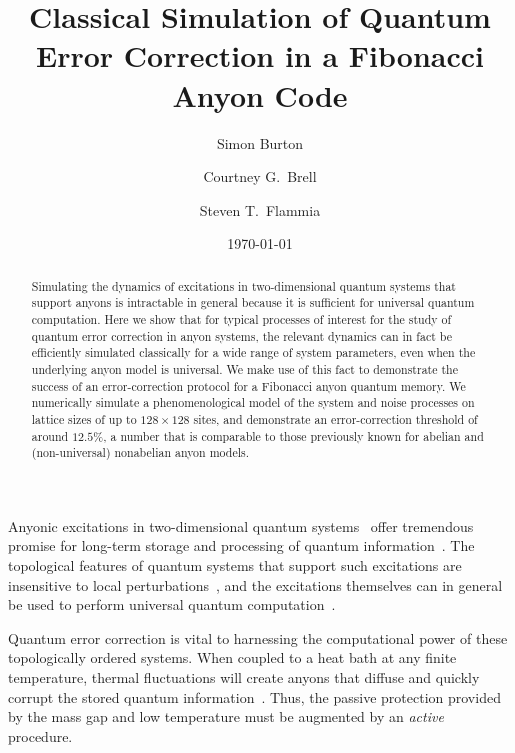 \documentclass[aps, prl, letterpaper, twocolumn, superscriptaddress, notitlepage]{revtex4-1}
\begin{document}
\title{Classical Simulation of Quantum Error Correction in a Fibonacci Anyon Code}

\author{Simon Burton}
\author{Courtney G.\ Brell}
\author{Steven T.\ Flammia}

\date{\today}

\begin{abstract}
Simulating the dynamics of excitations in two-dimensional quantum systems that support 
anyons is intractable in general because it is sufficient for universal quantum computation. 
Here we show that for typical processes of interest for the study of quantum error correction 
in anyon systems, the relevant dynamics can in fact be efficiently simulated classically for a 
wide range of system parameters, even when the underlying anyon model is universal. We 
make use of this fact to demonstrate the success of an error-correction protocol for a 
Fibonacci anyon quantum memory. We numerically simulate a phenomenological model of 
the system and noise processes on lattice sizes of up to $128\times128$ sites, and 
demonstrate an error-correction threshold of around $12.5\%$, a number that is comparable 
to those previously known for abelian and (non-universal) nonabelian anyon models.
\end{abstract}

\maketitle


Anyonic excitations in two-dimensional quantum systems~\cite{Wilczek1990} offer 
tremendous promise for long-term storage and processing of quantum 
information~\cite{Kitaev2003}. The topological features of quantum systems that support 
such excitations are insensitive to local 
perturbations~\cite{Bravyi2010, *Bravyi2011a, *Michalakis2013}, and the excitations 
themselves can in general be used to perform universal quantum 
computation~\cite{Freedman2002, *Freedman2002b}. 

Quantum error correction is vital to harnessing the computational power of these topologically 
ordered systems. When coupled to a heat bath at any finite temperature, thermal fluctuations 
will create anyons that diffuse and quickly corrupt the stored quantum 
information~\cite{Pastawski2010}. Thus, the passive protection provided by the mass gap 
and low temperature must be augmented by an \emph{active} procedure. 
\end{document}
